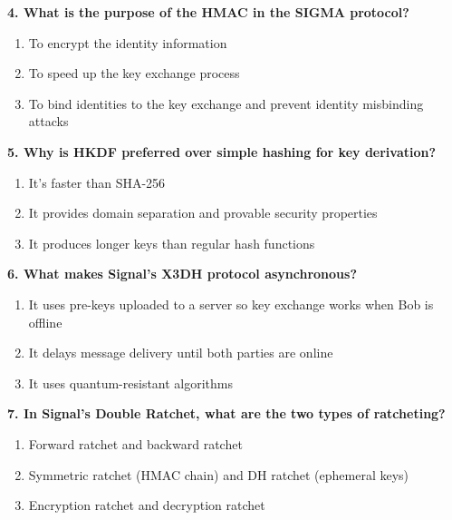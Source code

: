 \documentclass[10pt,a4paper,american]{article}
\begin{document}
\vspace{0.5em}

\textbf{4. What is the purpose of the HMAC in the SIGMA protocol?}
\begin{enumerate}[label=\alph*)]
	\item To encrypt the identity information
	\item To speed up the key exchange process
	\item To bind identities to the key exchange and prevent identity misbinding attacks
\end{enumerate}

\vspace{0.5em}

\textbf{5. Why is HKDF preferred over simple hashing for key derivation?}
\begin{enumerate}[label=\alph*)]
	\item It's faster than SHA-256
	\item It provides domain separation and provable security properties
	\item It produces longer keys than regular hash functions
\end{enumerate}

\vspace{0.5em}

\textbf{6. What makes Signal's X3DH protocol asynchronous?}
\begin{enumerate}[label=\alph*)]
	\item It uses pre-keys uploaded to a server so key exchange works when Bob is offline
	\item It delays message delivery until both parties are online
	\item It uses quantum-resistant algorithms
\end{enumerate}

\vspace{0.5em}

\textbf{7. In Signal's Double Ratchet, what are the two types of ratcheting?}
\begin{enumerate}[label=\alph*)]
	\item Forward ratchet and backward ratchet
	\item Symmetric ratchet (HMAC chain) and DH ratchet (ephemeral keys)
	\item Encryption ratchet and decryption ratchet
\end{enumerate}

\vspace{0.5em}
\end{document}
